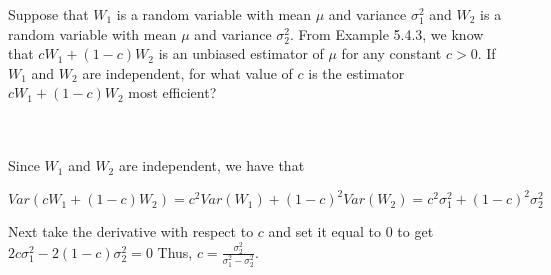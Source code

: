 Suppose that $W_1$ is a random variable with mean $\mu$ and variance $\sigma^2_1$ and $W_2$ is a random
variable with mean $\mu$ and variance $\sigma^2_2$. From Example 5.4.3, we know that $cW_1+(1-c)W_2$ is
an unbiased estimator of $\mu$ for any constant $c>0$. If $W_1$ and $W_2$ are independent, for what
value of $c$ is the estimator $cW_1+(1-c)W_2$ most efficient?\\\\

\begin{solution}\renewcommand{\qedsymbol}{}\ \\
    Since $W_1$ and $W_2$ are independent, we have that
    
    $$Var(cW_1+(1-c)W_2)=c^2Var(W_1)+(1-c)^2Var(W_2)=c^2\sigma_1^2+(1-c)^2\sigma_2^2$$
    
    Next take the derivative with respect to $c$ and set it equal to $0$ to get
    $2c\sigma_1^2-2(1-c)\sigma_2^2=0$ Thus, $c=\frac{\sigma_2^2}{\sigma_1^2-\sigma_2^2}$.

\end{solution}